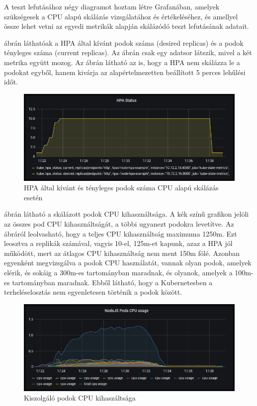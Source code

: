 \documentclass[a4paper,oneside]{article}
\begin{document}
A teszt lefutásához négy diagramot hoztam létre Grafanában, amelyek szükségesek
a CPU alapú skálázás vizsgálatához és értékeléséhez, és amellyel össze lehet
vetni az egyedi metrikák alapján skálázódó teszt lefutásának adatait.


 ábrán láthatóak a HPA által kívánt podok száma (desired
replicas) és a podok tényleges száma (current replicas).  Az ábrán csak egy
adatsor látszik, mivel a két metrika együtt mozog.  Az ábrán látható az is, hogy
a HPA nem skálázza le a podokat egyből, hanem kivárja az alapértelmezetten
beállított 5 perces lehűlési időt.

\begin{figure}[H]
  \centering
  \includegraphics[width=\textwidth]{light_cpu_hpa.PNG}
  \caption{HPA által kívánt és tényleges podok száma CPU alapú skálázás esetén}
  \label{light_cpu_hpa}  
\end{figure}

 ábrán látható a skálázott podok CPU kihasználtsága.  A kék
színű grafikon jelöli az összes pod CPU kihasználtságát, a többi ugyanezt
podokra levetítve.  Az ábráról leolvasható, hogy a teljes CPU kihasználtság
maximuma 1250m.  Ezt leosztva a replikák számával, vagyis 10-el, 125m-et
kapunk, azaz a HPA jól működött, mert az átlagos CPU kihasználtság nem ment
150m fölé. Azonban egyenként megvizsgálva a podok CPU használatát, vannak
olyan podok, amelyek elérik, és sokáig a 300m-es tartományban maradnak, és
olyanok, amelyek a 100m-es tartományban maradnak.  Ebből látható, hogy a
Kubernetesben a terheléselosztás nem egyenletesen történik a podok között.

\begin{figure}[H]
  \centering
  \includegraphics[width=\textwidth]{light_cpu_cpu.PNG}
  \caption{Kiszolgáló podok CPU kihaszáltsága}
  \label{light_cpu_cpu}  
\end{figure}
\end{document}
